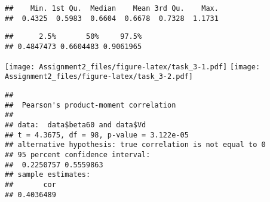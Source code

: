 \documentclass[
]{article}
\begin{document}
\begin{verbatim}
##    Min. 1st Qu.  Median    Mean 3rd Qu.    Max. 
##  0.4325  0.5983  0.6604  0.6678  0.7328  1.1731
\end{verbatim}

\begin{verbatim}
##      2.5%       50%     97.5% 
## 0.4847473 0.6604483 0.9061965
\end{verbatim}

\texttt{[image: Assignment2\_files/figure-latex/task\_3-1.pdf]}
\texttt{[image: Assignment2\_files/figure-latex/task\_3-2.pdf]}

\begin{verbatim}
## 
##  Pearson's product-moment correlation
## 
## data:  data$beta60 and data$Vd
## t = 4.3675, df = 98, p-value = 3.122e-05
## alternative hypothesis: true correlation is not equal to 0
## 95 percent confidence interval:
##  0.2250757 0.5559863
## sample estimates:
##       cor 
## 0.4036489
\end{verbatim}
\end{document}
